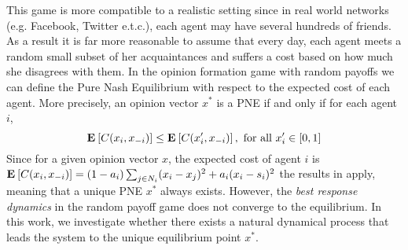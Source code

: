 This game is more compatible to a realistic setting since
in real world networks (e.g. Facebook, Twitter e.t.c.), each agent may have
several hundreds of friends. As a result it is far more reasonable to assume that
every day, each agent meets a random small subset of her acquaintances and
suffers a cost based on how much she disagrees with them.
In the opinion formation game with random payoffs we can define
the Pure Nash Equilibrium with respect to the expected cost of each agent.
More precisely, an opinion vector $x^*$ is a PNE if and only if for each agent $i$,
\[\Exp{C(x_i, x_{-i})} \leq \Exp{C(x_i', x_{-i})}, \text{ for all }x_i' \in [0,1]\]
Since for a given opinion vector $x$, the expected cost of agent $i$
is $ \Exp{C(x_i, x_{-i})} = (1-a_i)\sum_{j \in N_i}(x_i-x_j)^2 + a_i(x_i-s_i)^2$ the 
results in \cite{BKO11} apply, meaning that a unique PNE $x^*$ always exists.
However, the \emph{best response dynamics} in the random payoff game
does not converge to the equilibrium.  In this work, we investigate
whether there exists a natural dynamical process that leads the system to the
unique equilibrium point $x^*$.

